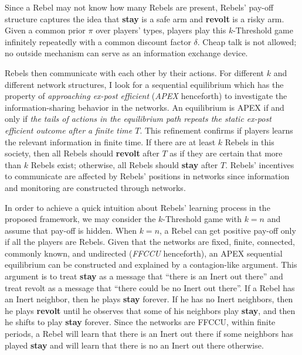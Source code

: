 \documentclass[12pt,letterpaper]{article}
\theoremstyle{definition}
\theoremstyle{remark}
\theoremstyle{claim}
\begin{document}
Since a Rebel may not know how many Rebels are present, Rebels' pay-off structure captures the idea that \textbf{stay} is a safe arm and \textbf{revolt} is a risky arm. Given a common prior $\pi$ over players' types, players play this $k$-Threshold game infinitely repeatedly with a common discount factor $\delta$. Cheap talk is not allowed; no outside mechanism can serve as an information exchange device. 


Rebels then communicate with each other by their actions. For different $k$ and different network structures, I look for a sequential equilibrium which has the property of \textit{approaching ex-post efficient} (\textit{APEX} henceforth) to investigate the information-sharing behavior in the networks. An equilibrium is APEX if and only if \textit{the tails of actions in the equilibrium path repeats the static ex-post efficient outcome after a finite time $T$}. This refinement confirms if players learns the relevant information in finite time. If there are at least $k$ Rebels in this society, then all Rebels should \textbf{revolt} after $T$ as if they are certain that more than $k$ Rebels exist; otherwise, all Rebels should \textbf{stay} after $T$. Rebels’ incentives to communicate are affected by Rebels' positions in networks since information and monitoring are constructed through networks.

In order to achieve a quick intuition about Rebels' learning process in the proposed framework, we may consider the $k$-Threshold game with $k=n$ and assume that pay-off is hidden. When $k=n$, a Rebel can get positive pay-off only if all the players are Rebels. Given that the networks are fixed, finite, connected, commonly known, and undirected (\textit{FFCCU} henceforth), an APEX sequential equilibrium can be constructed and explained by a contagion-like argument. This argument is to treat \textbf{stay} as a message that ``there is an Inert out there'' and treat revolt as a message that ``there could be no Inert out there''. If a Rebel has an Inert neighbor, then he plays \textbf{stay} forever. If he has no Inert neighbors, then he plays \textbf{revolt} until he observes that some of his neighbors play \textbf{stay}, and then he shifts to play \textbf{stay} forever. Since the networks are FFCCU, within finite periods, a Rebel will learn that there is an Inert out there if some neighbors has played \textbf{stay} and will learn that there is no an Inert out there otherwise.
\end{document}
